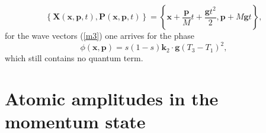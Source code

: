 \documentclass[twocolumn,showpacs,preprintnumbers]{revtex4}
\begin{document}
\begin{equation}
\left\{ \mathbf{X}\left( \mathbf{x},\mathbf{p},t\right) ,\mathbf{P}\left( 
\mathbf{x},\mathbf{p},t\right) \right\} =\left\{ \mathbf{x}+\dfrac{\mathbf{p}%
}{M}t+\dfrac{\mathbf{g}t^{2}}{2},\mathbf{p}+M\mathbf{g}t\right\} ,
\label{m11}
\end{equation}%
for the wave vectors (\ref{m3}) one arrives for the phase%
\begin{equation}
\phi \left( \mathbf{x},\mathbf{p}\right) =s\left( 1-s\right) \mathbf{k}%
_{2}\cdot \mathbf{g}\left( T_{3}-T_{1}\right) ^{2},  \label{m12}
\end{equation}%
which still contains no quantum term.

\section{\label{b}Atomic amplitudes in the momentum state}
\end{document}
